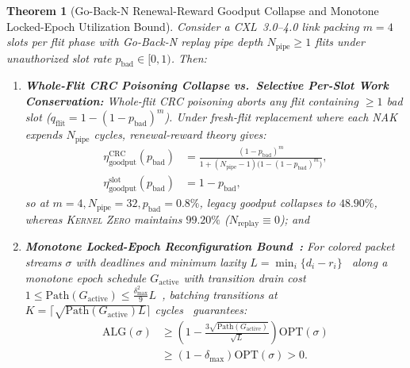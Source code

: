 \documentclass[11pt,letterpaper]{article}
\theoremstyle{spectralthm}
\newtheorem{theorem}{Theorem}[section]
\begin{document}
\begin{theorem}[Go-Back-N Renewal-Reward Goodput Collapse and Monotone Locked-Epoch Utilization Bound]
\label{thm:goodput}
Consider a \mbox{CXL~3.0--4.0} link packing $m = 4$ slots per flit phase with Go-Back-N replay pipe depth $N_{\mathrm{pipe}} \ge 1$ flits under unauthorized slot rate $p_{\mathrm{bad}} \in [0, 1)$. Then:
\begin{enumerate}
  \item[(i)] \textbf{Whole-Flit CRC Poisoning Collapse vs.\ Selective Per-Slot Work Conservation:} Whole-flit CRC poisoning aborts any flit containing $\ge 1$ bad slot ($q_{\mathrm{flit}} = 1 - (1 - p_{\mathrm{bad}})^m$). Under fresh-flit replacement where each NAK expends $N_{\mathrm{pipe}}$ cycles, renewal-reward theory gives:
  \begin{equation}
  \label{eq:goodput}
  \begin{aligned}
  \eta_{\mathrm{goodput}}^{\mathrm{CRC}}(p_{\mathrm{bad}}) &= \frac{(1 - p_{\mathrm{bad}})^m}{1 + (N_{\mathrm{pipe}} - 1)\bigl(1 - (1 - p_{\mathrm{bad}})^m\bigr)},\\
  \eta_{\mathrm{goodput}}^{\mathrm{slot}}(p_{\mathrm{bad}}) &= 1 - p_{\mathrm{bad}},
  \end{aligned}
  \end{equation}
  so at $m = 4, N_{\mathrm{pipe}} = 32, p_{\mathrm{bad}} = 0.8\%$, legacy goodput collapses to $48.90\%$, whereas \textsc{Kernel Zero} maintains $99.20\%$ ($N_{\mathrm{replay}} \equiv 0$); and
  \item[(ii)] \textbf{Monotone Locked-Epoch Reconfiguration Bound~\cite{azar2009buffer, azar2013metric, azar2026lossless}:} For colored packet streams $\sigma$ with deadlines and minimum laxity $L = \min_i\{d_i - r_i\}$~\cite{azar2009buffer} along a monotone epoch schedule $G_{\mathrm{active}}$ with transition drain cost $1 \le \mathrm{Path}(G_{\mathrm{active}}) \le \frac{\delta_{\max}^2}{9} L$~\cite{azar2013metric}, batching transitions at $K = \lceil \sqrt{\mathrm{Path}(G_{\mathrm{active}}) L} \rceil$ cycles~\cite{azar2026lossless} guarantees:
  \begin{equation}
  \label{eq:azar_vardi}
  \begin{aligned}
  \mathrm{ALG}(\sigma) &\ge \left(1 - \frac{3\sqrt{\mathrm{Path}(G_{\mathrm{active}})}}{\sqrt{L}}\right) \mathrm{OPT}(\sigma)\\
  &\ge (1 - \delta_{\max})\mathrm{OPT}(\sigma) > 0.
  \end{aligned}
  \end{equation}
\end{enumerate}
\end{theorem}
\end{document}
